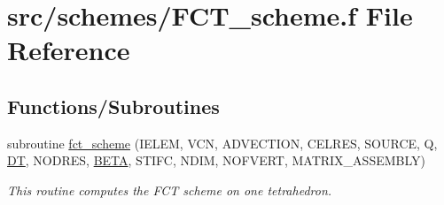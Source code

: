 \hypertarget{_f_c_t__scheme_8f}{\section{src/schemes/\-F\-C\-T\-\_\-scheme.f File Reference}
\label{_f_c_t__scheme_8f}
}
\subsection*{Functions/\-Subroutines}
\begin{DoxyCompactItemize}
\item 
subroutine \hyperlink{_f_c_t__scheme_8f_a9fe7ce4db6a844a0281b9292abd3c6d7}{fct\-\_\-scheme} (I\-E\-L\-E\-M, V\-C\-N, A\-D\-V\-E\-C\-T\-I\-O\-N, C\-E\-L\-R\-E\-S, S\-O\-U\-R\-C\-E, Q, \hyperlink{myts_8com_a41549d5ede5e2b840495daf35608da41}{D\-T}, N\-O\-D\-R\-E\-S, \hyperlink{blk_euler_i_i_8com_a41ef0ad0ee32dac89987c7180349fc65}{B\-E\-T\-A}, S\-T\-I\-F\-C, N\-D\-I\-M, N\-O\-F\-V\-E\-R\-T, M\-A\-T\-R\-I\-X\-\_\-\-A\-S\-S\-E\-M\-B\-L\-Y)
\begin{DoxyCompactList}\small\item\em This routine computes the F\-C\-T scheme on one tetrahedron. \end{DoxyCompactList}\end{DoxyCompactItemize}


